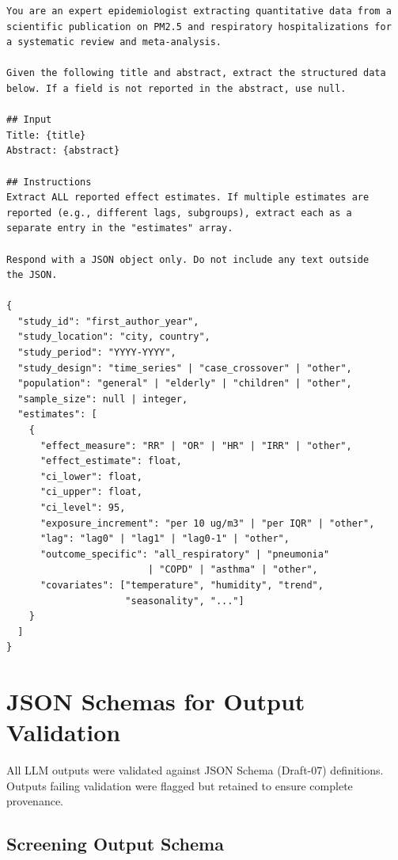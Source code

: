\documentclass[11pt]{article}
\begin{document}
\begin{lstlisting}[language={},caption={Extraction prompt template (\texttt{configs/prompts/extraction.txt})}]
You are an expert epidemiologist extracting quantitative data from a
scientific publication on PM2.5 and respiratory hospitalizations for
a systematic review and meta-analysis.

Given the following title and abstract, extract the structured data
below. If a field is not reported in the abstract, use null.

## Input
Title: {title}
Abstract: {abstract}

## Instructions
Extract ALL reported effect estimates. If multiple estimates are
reported (e.g., different lags, subgroups), extract each as a
separate entry in the "estimates" array.

Respond with a JSON object only. Do not include any text outside
the JSON.

{
  "study_id": "first_author_year",
  "study_location": "city, country",
  "study_period": "YYYY-YYYY",
  "study_design": "time_series" | "case_crossover" | "other",
  "population": "general" | "elderly" | "children" | "other",
  "sample_size": null | integer,
  "estimates": [
    {
      "effect_measure": "RR" | "OR" | "HR" | "IRR" | "other",
      "effect_estimate": float,
      "ci_lower": float,
      "ci_upper": float,
      "ci_level": 95,
      "exposure_increment": "per 10 ug/m3" | "per IQR" | "other",
      "lag": "lag0" | "lag1" | "lag0-1" | "other",
      "outcome_specific": "all_respiratory" | "pneumonia"
                         | "COPD" | "asthma" | "other",
      "covariates": ["temperature", "humidity", "trend",
                     "seasonality", "..."]
    }
  ]
}
\end{lstlisting}

\section{JSON Schemas for Output Validation}
\label{sec:schemas}

All LLM outputs were validated against JSON Schema (Draft-07) definitions.
Outputs failing validation were flagged but retained to ensure complete provenance.

\subsection{Screening Output Schema}
\end{document}
